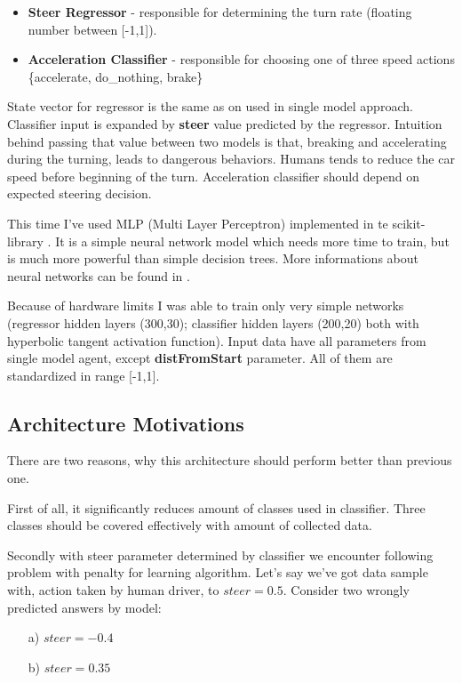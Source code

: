 \documentclass[declaration,shortabstract,english,inz]{iithesis}
\begin{document}
\begin{itemize}
    \item \textbf{Steer Regressor} - responsible for determining the turn rate (floating number between [-1,1]).
    \item \textbf{Acceleration Classifier} - responsible for choosing one of three speed actions \{accelerate, do\_nothing, brake\}
\end{itemize}

State vector for regressor is the same as on used in single model approach.
Classifier input is expanded by \textbf{steer} value predicted by the regressor.
Intuition behind passing that value between two models is that, breaking and accelerating during the turning, leads to dangerous behaviors.
Humans tends to reduce the car speed before beginning of the turn.
Acceleration classifier should depend on expected steering decision.


This time I've used MLP (Multi Layer Perceptron) implemented in te scikit-library \cite{scikit_learn}.
It is a simple neural network model which needs more time to train, but is much more powerful than simple decision trees. More informations about neural networks can be found in \cite{neuraln_nets}.


Because of hardware limits I was able to train only very simple networks (regressor hidden layers (300,30); classifier hidden layers (200,20) both with hyperbolic tangent activation function).
Input data have all parameters from single model agent, except \textbf{distFromStart} parameter.
All of them are standardized in range [-1,1].

\subsection{Architecture Motivations}

There are two reasons, why this architecture should perform better than previous one.

First of all, it significantly reduces amount of classes used in classifier.
Three classes should be covered effectively with amount of collected data.

Secondly with steer parameter determined by classifier we encounter following problem with penalty for learning algorithm.
Let's say we've got data sample with, action taken by human driver, to $steer=0.5$.
Consider two wrongly predicted answers by model:
\begin{itemize}
    \item[a)] $steer=-0.4$
    \item[b)] $steer=0.35$
\end{itemize}
\end{document}

